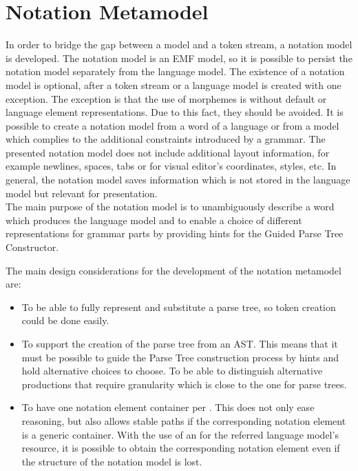 \section{Notation Metamodel} \label{chp:NotMM}
In order to bridge the gap between a model and a token stream, a notation model is developed. The notation model is an EMF model, so it is possible to persist the notation model separately from the language model. The existence of a notation model is optional, after a token stream or a language model is created with one exception. The exception is that the use of morphemes is without default or language element representations. Due to this fact, they should be avoided. It is possible to create a notation model from a word of a language or from a model which complies to the additional constraints introduced by a grammar. The presented notation model does not include additional layout information, for example newlines, spaces, tabs or for visual editor's coordinates, styles, etc. In general, the notation model saves information which is not stored in the language model but relevant for presentation.\\

The main purpose of the notation model is to unambiguously describe a word which produces the language model and to enable a choice of different representations for grammar parts by providing hints for the Guided Parse Tree Constructor.

The main design considerations for the development of the notation metamodel are:
\begin{itemize}
	\item To be able to fully represent and substitute a parse tree, so token creation could be done easily.
	\item To support the creation of the parse tree from an AST. This means that it must be possible to guide the Parse Tree construction process by hints and hold alternative choices to choose. To be able to distinguish alternative productions that require granularity which is close to the one for parse trees.
	\item To have one notation element container per . This does not only ease reasoning, but also allows stable paths if the corresponding notation element is a generic container. With the use of an  for the referred language model's resource, it is possible to obtain the corresponding notation element even if the structure of the notation model is lost. 
\end{itemize}

